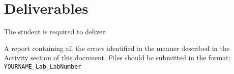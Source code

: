 \section{Deliverables}

The student is required to deliver:

A report containing all the errors identified in the manner described in the Activity section of this document. Files should be submitted in the format: 
 \verb=YOURNAME_Lab_LabNumber=